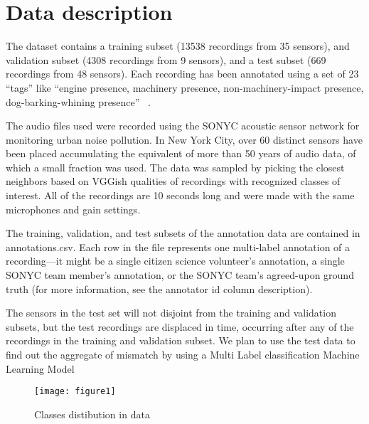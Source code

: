 \section{Data description}
The dataset contains a training subset (13538 recordings from 35 sensors), and validation subset (4308 recordings from 9 sensors), and a test subset (669 recordings from 48 sensors). Each recording has been annotated using a set of 23 “tags” like “engine presence, machinery presence, non-machinery-impact presence, dog-barking-whining presence” ~\cite{4}.

The audio files used were recorded using the SONYC acoustic sensor network for monitoring urban noise pollution. In New York City, over 60 distinct sensors have been placed accumulating the equivalent of more than 50 years of audio data, of which a small fraction was used. The data was sampled by picking the closest neighbors based on VGGish qualities of recordings with recognized classes of interest. All of the recordings are 10 seconds long and were made with the same microphones and gain settings. 

The training, validation, and test subsets of the annotation data are contained in annotations.csv. Each row in the file represents one multi-label annotation of a recording—it might be a single citizen science volunteer's annotation, a single SONYC team member's annotation, or the SONYC team's agreed-upon ground truth (for more information, see the annotator id column description).

The sensors in the test set will not disjoint from the training and validation subsets, but the test recordings are displaced in time, occurring after any of the recordings in the training and validation subset. We plan to use the test data to find out the aggregate of mismatch by using a Multi Label classification Machine Learning Model

	
	\begin{figure}[h!]
		
		\texttt{[image: figure1]}
		\caption{ Classes distibution in data}
	\end{figure}
	


	
	
	
	

	
	
